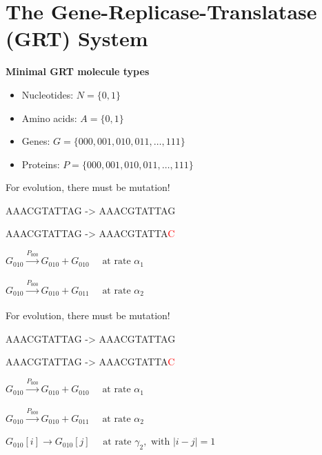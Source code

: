 \documentclass{beamer}
\begin{document}
\section{The Gene-Replicase-Translatase (GRT) System}

\begin{frame}
\textbf{Minimal GRT molecule types}

\begin{itemize}
\item Nucleotides: $N = \{0,1\}$
\item Amino acids: $A = \{0,1\}$
\item Genes: $G = \{000, 001, 010, 011, \dots, 111\}$
\item Proteins: $P = \{000, 001, 010, 011, \dots, 111\}$
\end{itemize}

\end{frame}


\begin{frame}
For evolution, there must be mutation! 

\begin{center}
AAACGTATTAG -> AAACGTATTAG

AAACGTATTAG -> AAACGTATTA\textcolor{red}{C}

\vspace{5mm}
$G_{010} \xrightarrow[]{P_{000}} G_{010} + G_{010}\quad \text{ at rate } \alpha_1
\label{eq:basicRep}$

$G_{010} \xrightarrow[]{P_{000}} G_{010} + G_{011}\quad \text{ at rate } \alpha_2
\label{eq:basicError}$

\end{center}
\end{frame}

\begin{frame}
\vspace{6mm}
For evolution, there must be mutation! 

\begin{center}
AAACGTATTAG -> AAACGTATTAG

AAACGTATTAG -> AAACGTATTA\textcolor{red}{C}

\vspace{5mm}
$G_{010} \xrightarrow[]{P_{000}} G_{010} + G_{010}\quad \text{ at rate } \alpha_1
\label{eq:basicRep}$

$G_{010} \xrightarrow[]{P_{000}} G_{010} + G_{011}\quad \text{ at rate } \alpha_2
\label{eq:basicError}$

\vspace{5mm}
$G_{010}[i] \xrightarrow[]{}G_{010}[j] \quad \text{ at rate } \gamma_2, \text{ with }|i-j|=1$
\end{center}
\end{frame}
\end{document}
